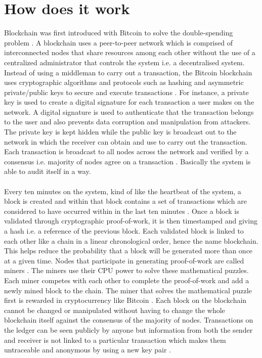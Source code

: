\documentclass[report]{IEEEtran}
\begin{document}
\section{How does it work}
 Blockchain was first introduced with Bitcoin to solve the double-spending problem \cite{bitcoin}. A blockchain uses a peer-to-peer network which is comprised of interconnected nodes that share resources among each other without the use of a centralized administrator that controls the system i.e. a decentralised system. Instead of using a middleman to carry out a transaction, the Bitcoin blockchain uses cryptographic algorithms and protocols such as hashing and asymmetric private/public keys to secure and execute transactions \cite{bitcoin}. For instance, a private key is used to create a digital signature for each transaction a user makes on the network. A digital signature is used to authenticate that the transaction belongs to the user and also prevents data corruption and manipulation from attackers. The private key is kept hidden while the public key is broadcast out to the network in which the receiver can obtain and use to carry out the transaction. Each transaction is broadcast to all nodes across the network and verified by a consensus i.e. majority of nodes agree on a transaction \cite{bitcoin}. Basically the system is able to audit itself in a way.
 \\\\ Every ten minutes on the system, kind of like the heartbeat of the system, a block is created and within that block contains a set of transactions which are considered to have occurred within in the last ten minutes \cite{air}. Once a block is validated through cryptographic proof-of-work, it is then timestamped and giving a hash \cite{timestamp} i.e. a reference of the previous block. Each validated block is linked to each other like a chain in a linear chronological order, hence the name blockchain. This helps reduce the probability that a block will be generated more than once at a given time. Nodes that participate in generating proof-of-work are called miners \cite{survey}. The miners use their CPU power to solve these mathematical puzzles. Each miner competes with each other to complete the proof-of-work and add a newly mined block to the chain. The miner that solves the mathematical puzzle first is rewarded in cryptocurrency like Bitcoin \cite{bitcoin}. Each block on the blockchain cannot be changed or manipulated without having to change the whole blockchain itself against the consensus of the majority of nodes. Transactions on the ledger can be seen publicly by anyone but information from both the sender and receiver is not linked to a particular transaction which makes them untraceable and anonymous by using a new key pair \cite{bitcoin}.
 
\end{document}
